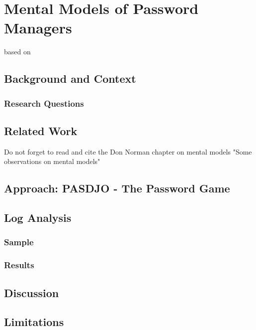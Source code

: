 \chapter[Mental Models of Password Managers]{Mental Models of Password Managers}\label{chap:mental_models}

based on \cite{Prinz2017MentalModel}

\section{Background and Context}


\subsection{Research Questions}

\section{Related Work}
Do not forget to read and cite the Don Norman chapter on mental models "Some observations on mental models"
\section{Approach: PASDJO - The Password Game}


\section{Log Analysis}

\subsection{Sample}
\subsection{Results}


\section{Discussion}


\section{Limitations}

